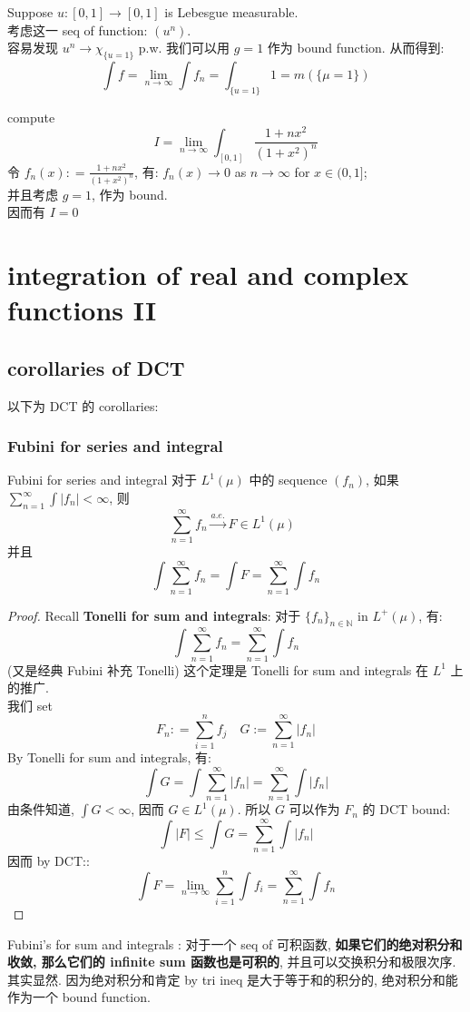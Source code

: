 \documentclass[lang=cn,11pt]{elegantbook}
\begin{document}
\begin{example}
    Suppose $u:[0,1] \to [0,1]$ is Lebesgue measurable. \\
    考虑这一 seq of function: $( u^n)$.\\
    容易发现 $u^n \rightarrow \chi_{\{u = 1\}}$ p.w.
    我们可以用 $g = 1$ 作为 bound function. 从而得到: \[
\int f=    \lim_{n\to\infty} \int f_n = \int_{\{u=1\}}1 = m(\{\mu =1 \})
    \]
\end{example}


\begin{example}
    compute \[
    I = \lim_{n\to \infty} \int_{[0,1]} \frac{1 + n x^2}{(1+ x^2)^n}
    \]
令 $f_n(x) : = \frac{1 + n x^2}{(1+ x^2)^n}$, 有: $f_n(x) \to 0$ as $n\to \infty$ for $x \in (0,1]$;\\
并且考虑 $g=1$, 作为 bound.\\
因而有 $I = 0$
\end{example}


\chapter{integration of real and complex functions II}
\section{corollaries of DCT}
以下为 DCT 的 corollaries:

\subsection{Fubini for series and integral}
\begin{corollary}{Fubini for series and integral}
对于 $L^1(\mu)$ 中的 sequence $(f_n)$,  如果 $\sum_{n=1}^\infty \int |f_n| < \infty$, 则 $$\sum_{n=1}^\infty f_n   \overset{a.e.}{\to}  F\in L^1(\mu) \;\;$$ 并且 \[  \int \sum_{n=1}^\infty f_n 
 =    \int F = \sum_{n=1}^\infty \int f_n\]
\end{corollary}
\begin{proof}
Recall \textbf{Tonelli for sum and integrals}: 对于 $\{f_n\}_{n\in\mathbb{N}}$ in $L^+(\mu)$, 有:
$$
\int \sum_{n=1}^\infty f_n = \sum_{n=1}^\infty \int f_n
$$
(又是经典 Fubini 补充 Tonelli) 这个定理是 Tonelli for sum and integrals 在 $L^1$ 上的推广.\\
我们 set \[
F_n : = \sum_{i=1}^n f_j\quad G:= \sum_{n=1}^\infty  |f_n|
\]
By Tonelli for sum and integrals, 有: \[
\int G = \int \sum_{n=1}^\infty  |f_n| =  \sum_{n=1}^\infty \int  |f_n| 
\]
由条件知道, $\int G < \infty$, 因而 $G \in L^1(\mu)$.
所以 $G$ 可以作为 $F_n $ 的 DCT bound: \[
\int |F| \leq \int G = \sum_{n=1}^\infty \int  |f_n| 
\] 因而 by DCT:: \[
\int F = \lim_{n\to \infty } \sum_{i=1}^n \int f_i =  \sum_{n=1}^\infty \int f_n
\]
\end{proof}
\begin{remark}
    Fubini's for sum and integrals : 对于一个 seq of 可积函数, \textbf{如果它们的绝对积分和收敛, 那么它们的 infinite sum 函数也是可积的}, 并且可以交换积分和极限次序. \\
    其实显然. 因为绝对积分和肯定 by tri ineq 是大于等于和的积分的, 绝对积分和能作为一个 bound function.
\end{remark}
\end{document}
